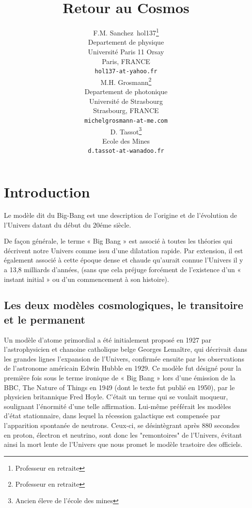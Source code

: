 \documentclass[a4paper,12pt]{article}
\title{Retour au Cosmos}
\author{
  F.M. Sanchez~hol137\thanks{Professeur en retraite} \\
  Departement de physique\\
  Université Paris 11 Orsay \\
  Paris, FRANCE \\
  \texttt{hol137-at-yahoo.fr} \\
   \And
 M.H. Grosmann\thanks{Professeur en retraite} \\
  Departement de photonique\\
  Université de Strasbourg\\
  Strasbourg, FRANCE \\
  \texttt{michelgrosmann-at-me.com} \\
   \And
 D. Tassot\thanks{Ancien éleve de l'école des mines} \\
  Ecole des Mines\\
  \texttt{d.tassot-at-wanadoo.fr} \\
}
\begin{document}
\maketitle

\tableofcontents

\section*{Introduction}


Le modèle dit du Big-Bang est une description de l'origine et de l'évolution de l’Univers datant du début du 20éme siècle.

De façon générale, le terme « Big Bang » est associé à toutes les théories qui décrivent notre Univers comme issu d'une dilatation rapide. Par extension, il est également associé à cette époque dense et chaude qu’aurait connue l’Univers il y a 13,8 milliards d’années, (sans que cela préjuge forcément de l’existence d’un « instant initial » ou d’un commencement à son histoire).

\subsection{Les deux modèles cosmologiques, le transitoire et le permanent}
\label{sec:headings}

Un modèle d'atome primordial a été initialement proposé en 1927 par l'astrophysicien  et chanoine catholique belge Georges Lemaître, qui décrivait dans les grandes lignes l’expansion de l'Univers, confirmée ensuite par les observations de l'astronome américain Edwin Hubble en 1929. Ce modèle fut désigné pour la première fois sous le terme ironique de « Big Bang » lors d’une émission de la BBC, The Nature of Things en 1949 (dont le texte fut publié en 1950), par le physicien britannique Fred Hoyle. C'était un terme qui se voulait moqueur, soulignant l'énormité d'une telle affirmation. Lui-même préférait les modèles d'état stationnaire, dans lequel la récession galactique est compensée par l'apparition spontanée de neutrons. Ceux-ci, se désintègrant après 880 secondes en proton, électron et neutrino, sont donc les "remontoires" de l'Univers, évitant ainsi la mort lente de l'Univers que nous promet le modèle trastoire des officiels.
\end{document}
